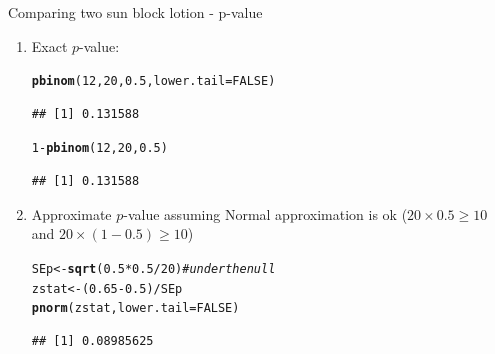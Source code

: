 \documentclass{beamer}\usepackage[]{graphicx}\usepackage[]{color}
\newcommand{\hlnum}[1]{\textcolor[rgb]{0.686,0.059,0.569}{#1}}%
\newcommand{\hlcom}[1]{\textcolor[rgb]{0.678,0.584,0.686}{\textit{#1}}}%
\newcommand{\hlopt}[1]{\textcolor[rgb]{0,0,0}{#1}}%
\newcommand{\hlstd}[1]{\textcolor[rgb]{0.345,0.345,0.345}{#1}}%
\newcommand{\hlkwb}[1]{\textcolor[rgb]{0.69,0.353,0.396}{#1}}%
\newcommand{\hlkwc}[1]{\textcolor[rgb]{0.333,0.667,0.333}{#1}}%
\newcommand{\hlkwd}[1]{\textcolor[rgb]{0.737,0.353,0.396}{\textbf{#1}}}%
\newenvironment{knitrout}{}{} %
\begin{document}
\begin{frame}[fragile]{Comparing two sun block lotion - p-value}
\small
\begin{enumerate}
	\setlength\itemsep{.51em}
	
	\item Exact $p$-value:
\begin{knitrout}\scriptsize
{}\color{fgcolor}
\begin{alltt}
\hlkwd{pbinom}\hlstd{(}\hlnum{12}\hlstd{,} \hlnum{20}\hlstd{,} \hlnum{0.5}\hlstd{,} \hlkwc{lower.tail} \hlstd{=} \hlnum{FALSE}\hlstd{)}
\end{alltt}
\begin{verbatim}
## [1] 0.131588
\end{verbatim}
\begin{alltt}
\hlnum{1} \hlopt{-} \hlkwd{pbinom}\hlstd{(}\hlnum{12}\hlstd{,} \hlnum{20}\hlstd{,} \hlnum{0.5}\hlstd{)}
\end{alltt}
\begin{verbatim}
## [1] 0.131588
\end{verbatim}

\end{knitrout}
	\pause 

	\item Approximate $p$-value assuming Normal approximation is ok ($20 \times 0.5 \geq 10$ and $20 \times (1-0.5) \geq 10$)
\begin{knitrout}\scriptsize
{}\color{fgcolor}
\begin{alltt}
\hlstd{SEp} \hlkwb{<-} \hlkwd{sqrt}\hlstd{(}\hlnum{0.5}\hlopt{*}\hlnum{0.5}\hlopt{/}\hlnum{20}\hlstd{)} \hlcom{# under the null}
\hlstd{zstat} \hlkwb{<-} \hlstd{(}\hlnum{0.65} \hlopt{-} \hlnum{0.5}\hlstd{)} \hlopt{/} \hlstd{SEp}
\hlkwd{pnorm}\hlstd{(zstat,} \hlkwc{lower.tail} \hlstd{=} \hlnum{FALSE}\hlstd{)}
\end{alltt}
\begin{verbatim}
## [1] 0.08985625
\end{verbatim}

\end{knitrout}
	
	
	
\end{enumerate}

\end{frame}
\end{document}
